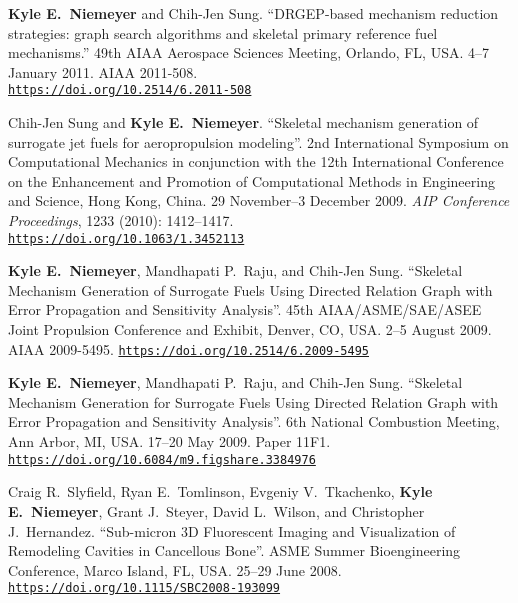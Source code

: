 \documentclass[margin,line,11pt]{res}
\makeatletter
\newlength{\bibhang}
\newlength{\bibsep}
 {\@listi \global\bibsep\itemsep \global\advance\bibsep by\parsep}
\newenvironment{bibenum*}
  {\renewcommand\labelenumi{\theenumi.}%
   \etaremune[
     topsep=0pt,
     itemsep=\bibsep,
     parsep=0pt,partopsep=0pt,
     itemindent=-\bibhang,
     leftmargin={\bibhang+\widthof{[999]}}]}
  {\endetaremune}
\newcommand*{\doi}[1]{\href{https://doi.org/#1}{\nolinkurl{https://doi.org/#1}}}
\makeatother
\begin{document}
\begin{resume}
\begin{bibenum*}
\item \textbf{Kyle E.\ Niemeyer} and Chih-Jen Sung.
``DRGEP-based mechanism reduction strategies: graph search algorithms and skeletal primary reference fuel mechanisms.''
49th AIAA Aero\-space Sciences Meeting, Orlando, FL, USA.
4--7 January 2011.
AIAA 2011-508. \\
\doi{10.2514/6.2011-508}

\item Chih-Jen Sung and \textbf{Kyle E.\ Niemeyer}.
``Skeletal mechanism generation of surrogate jet fuels for aeropropulsion modeling''.
2nd International Symposium on Computational Mechanics in conjunction with the 12th International Conference on the Enhancement and Promotion of Computational Methods in Engineering and Science, Hong Kong, China.
29 November--3 December 2009.
\emph{AIP Conference Proceedings}, 1233 (2010): 1412--1417. \\
\doi{10.1063/1.3452113}


\item \textbf{Kyle E.\ Niemeyer}, Mandhapati P.\ Raju, and Chih-Jen Sung.
``Skeletal Mechanism Generation of Surrogate Fuels Using Directed Relation Graph with Error Propagation and Sensitivity Analysis''.
45th AIAA\slash ASME\slash SAE\slash ASEE Joint Propulsion Conference and Exhibit, Denver, CO, USA.
2--5 August 2009.
AIAA 2009-5495.
\doi{10.2514/6.2009-5495}

\item \textbf{Kyle E.\ Niemeyer}, Mandhapati P.\ Raju, and Chih-Jen Sung.
``Skeletal Mechanism Generation for Surrogate Fuels Using Directed Relation Graph with Error Propagation and Sensitivity Analysis''.
6th National Combustion Meeting, Ann Arbor, MI, USA.
17--20 May 2009.
Paper 11F1.
\doi{10.6084/m9.figshare.3384976}

\item Craig R.\ Slyfield, Ryan E.\ Tomlinson,  Evgeniy V.\ Tkachenko, \textbf{Kyle E.\ Niemeyer}, Grant J.\ Steyer, David L.\ Wilson, and Christopher J.\ Hernandez.
``Sub-micron 3D Fluorescent Imaging and Visualization of Remodeling Cavities in Cancellous Bone''.
ASME Summer Bioengineering Conference, Marco Island, FL, USA.
25--29 June 2008. \\
\doi{10.1115/SBC2008-193099}

\end{bibenum*}


\end{resume}
\end{document}
